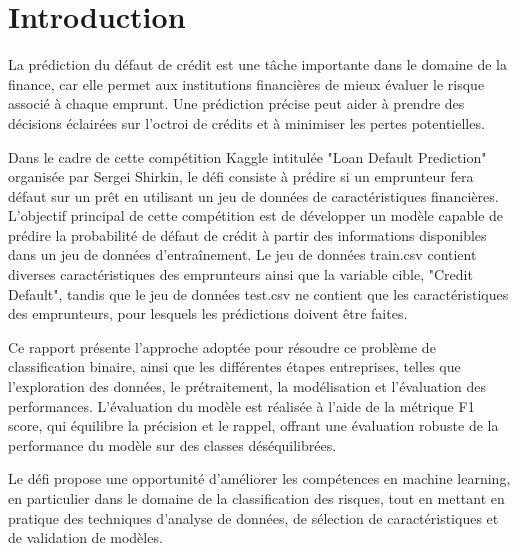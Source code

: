 \chapter*{Introduction}

La prédiction du défaut de crédit est une tâche importante dans le domaine de la finance, car elle permet aux institutions financières de mieux évaluer le risque associé à chaque emprunt. Une prédiction précise peut aider à prendre des décisions éclairées sur l'octroi de crédits et à minimiser les pertes potentielles.

Dans le cadre de cette compétition Kaggle intitulée "Loan Default Prediction" organisée par Sergei Shirkin, le défi consiste à prédire si un emprunteur fera défaut sur un prêt en utilisant un jeu de données de caractéristiques financières. L'objectif principal de cette compétition est de développer un modèle capable de prédire la probabilité de défaut de crédit à partir des informations disponibles dans un jeu de données d'entraînement. Le jeu de données train.csv contient diverses caractéristiques des emprunteurs ainsi que la variable cible, "Credit Default", tandis que le jeu de données test.csv ne contient que les caractéristiques des emprunteurs, pour lesquels les prédictions doivent être faites.

Ce rapport présente l'approche adoptée pour résoudre ce problème de classification binaire, ainsi que les différentes étapes entreprises, telles que l'exploration des données, le prétraitement, la modélisation et l'évaluation des performances. L'évaluation du modèle est réalisée à l'aide de la métrique F1 score, qui équilibre la précision et le rappel, offrant une évaluation robuste de la performance du modèle sur des classes déséquilibrées.

Le défi propose une opportunité d'améliorer les compétences en machine learning, en particulier dans le domaine de la classification des risques, tout en mettant en pratique des techniques d'analyse de données, de sélection de caractéristiques et de validation de modèles.